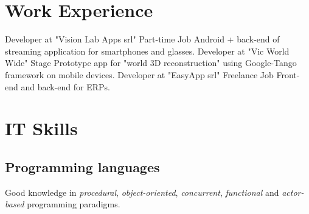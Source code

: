\documentclass[letterpaper]{twentysecondcv} %
\begin{document}

\section{Work Experience}

\begin{twenty} %
		{Developer at "Vision Lab Apps srl"\footnotemark[3]}	{Part-time Job}
		{Android + back-end of streaming application for smartphones and glasses.}
		{Developer at "Vic World Wide"\footnotemark[4]}	{Stage}
		{Prototype app for "world 3D reconstruction" using Google-Tango framework on mobile devices.}
		{Developer at "EasyApp srl"\footnotemark[5]}	{Freelance Job}
		{Front-end and back-end  for ERPs.}
\end{twenty}




\section{IT Skills}

\subsection{Programming languages}

Good knowledge in \textit{procedural}, \textit{object-oriented}, \textit{concurrent}, \textit{functional} and \textit{actor-based} programming paradigms.
\end{document}
